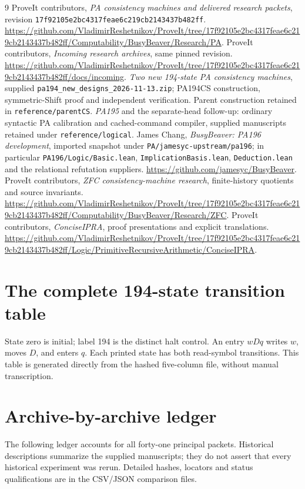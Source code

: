 \documentclass[11pt,letterpaper]{article}
\newcommand{\file}[1]{\texttt{\nolinkurl{#1}}}
\begin{document}
\begin{thebibliography}{9}
 ProveIt contributors, \emph{PA consistency machines and delivered
research packets}, revision \texttt{17f92105e2bc4317feae6c219cb2143437b482ff}.
\url{https://github.com/VladimirReshetnikov/ProveIt/tree/17f92105e2bc4317feae6c219cb2143437b482ff/Computability/BusyBeaver/Research/PA}.
 ProveIt contributors, \emph{Incoming research archives},
same pinned revision.
\url{https://github.com/VladimirReshetnikov/ProveIt/tree/17f92105e2bc4317feae6c219cb2143437b482ff/docs/incoming}.
 \emph{Two new 194-state PA consistency machines}, supplied
\file{pa194_new_designs_2026-11-13.zip}; PA194CS construction, symmetric-Shift
proof and independent verification. Parent construction retained in
\file{reference/parentCS}.
 \emph{PA195} and the separate-head follow-up:
ordinary syntactic PA calibration and cached-command compiler, supplied
manuscripts retained under \file{reference/logical}.
 James Chang, \emph{BusyBeaver: PA196 development}, imported
snapshot under \file{PA/jamesyc-upstream/pa196}; in particular
\file{PA196/Logic/Basic.lean}, \file{ImplicationBasis.lean},
\file{Deduction.lean} and the relational refutation suppliers.
\url{https://github.com/jamesyc/BusyBeaver}.
 ProveIt contributors, \emph{ZFC consistency-machine research},
finite-history quotients and source invariants.
\url{https://github.com/VladimirReshetnikov/ProveIt/tree/17f92105e2bc4317feae6c219cb2143437b482ff/Computability/BusyBeaver/Research/ZFC}.
 ProveIt contributors, \emph{ConciseIPRA}, proof presentations
and explicit translations.
\url{https://github.com/VladimirReshetnikov/ProveIt/tree/17f92105e2bc4317feae6c219cb2143437b482ff/Logic/PrimitiveRecursiveArithmetic/ConciseIPRA}.
\end{thebibliography}
\clearpage
\appendix
\section{The complete 194-state transition table}\label{app:table}
State zero is initial; label 194 is the distinct halt control. An entry
$wDq$ writes $w$, moves $D$, and enters $q$. Each printed state has both
read-symbol transitions. This table is generated directly from the
hashed five-column file, without manual transcription.

\clearpage
\section{Archive-by-archive ledger}\label{app:ledger}
The following ledger accounts for all forty-one principal packets.
Historical descriptions summarize the supplied manuscripts; they do not
assert that every historical experiment was rerun. Detailed hashes,
locators and status qualifications are in the CSV/JSON comparison files.

\end{document}
